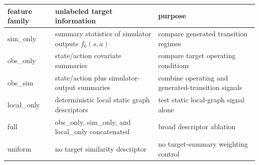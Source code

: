 \begin{tabular}{lll}
\toprule
feature family & unlabeled target information & purpose \\
\midrule
sim\_only & summary statistics of simulator outputs $f_0(s,a)$ & compare generated transition regimes \\
obs\_only & state/action covariate summaries & compare target operating conditions \\
obs\_sim & state/action plus simulator-output summaries & combine operating and generated-transition signals \\
local\_only & deterministic local static graph descriptors & test static local-graph signal alone \\
full & obs\_only, sim\_only, and local\_only concatenated & broad descriptor ablation \\
uniform & no target similarity descriptor & no target-summary weighting control \\
\bottomrule
\end{tabular}
